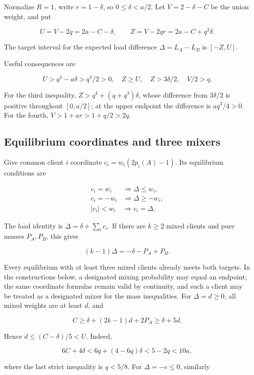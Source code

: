 \documentclass[11pt,a4paper]{article}
\begin{document}
Normalize \(R=1\), write \(r=1-\delta\), so \(0\le\delta<a/2\). Let \(V=2-\delta-C\) be the union weight, and put

\[
U=V-2q=2a-C-\delta,
\qquad Z=V-2qr=2a-C+q^3\delta.
\]

The target interval for the expected load difference \(\Delta=L_A-L_B\) is \([-Z,U]\).

Useful consequences are

\[
U>q^4-a\delta>q^4/2>0,\quad Z\ge U,\quad Z>3\delta/2,\quad V/2>q.
\]

For the third inequality, \(Z>q^4+(q+q^3)\delta\), whose difference from \(3\delta/2\) is positive throughout \([0,a/2]\); at the upper endpoint the difference is \(aq^3/4>0\). For the fourth, \(V>1+ar>1+q/2>2q\).

\hypertarget{equilibrium-coordinates-and-three-mixers}{%
\subsection{Equilibrium coordinates and three mixers}\label{equilibrium-coordinates-and-three-mixers}}

Give common client \(i\) coordinate \(c_i=w_i(2p_i(A)-1)\). Its equilibrium conditions are

\[
\begin{array}{ll}
c_i=w_i&\Longrightarrow\Delta\le w_i,\\
c_i=-w_i&\Longrightarrow\Delta\ge-w_i,\\
|c_i|<w_i&\Longrightarrow c_i=\Delta.
\end{array}
\]

The load identity is \(\Delta=\delta+\sum_i c_i\). If there are \(k\ge2\) mixed clients and pure masses \(P_A,P_B\), this gives

\[
(k-1)\Delta=-\delta-P_A+P_B.
\]

Every equilibrium with at least three mixed clients already meets both targets. In the constructions below, a designated mixing probability may equal an endpoint; the same coordinate formulas remain valid by continuity, and such a client may be treated as a designated mixer for the mass inequalities. For \(\Delta=d\ge0\), all mixed weights are at least \(d\), and

\[
C\ge \delta+(2k-1)d+2P_A\ge\delta+5d.
\]

Hence \(d\le(C-\delta)/5<U\). Indeed,

\[
6C+4\delta<6q+(4-6q)\delta<5-2q<10a,
\]

where the last strict inequality is \(q<5/8\). For \(\Delta=-e\le0\), similarly
\end{document}
